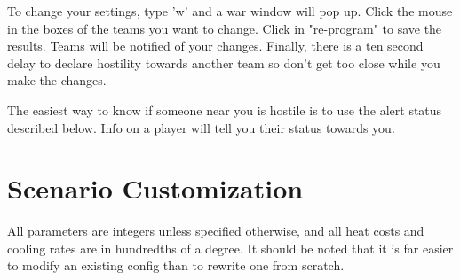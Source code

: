 To change your settings, type 'w' and a war window will pop up.
Click the mouse in the boxes of the teams you want to change.
Click in "re-program" to save the results.  Teams will be notified
of your changes.  Finally, there is a ten second delay to declare
hostility towards another team so don't get too close while you make
the changes.

The easiest way to know if someone near you is hostile is to use
the alert status described below.  Info on a player will tell you
their status towards you.

\section{Scenario Customization}

All parameters are integers unless specified otherwise, and all 
heat costs and cooling rates are in hundredths of a degree. It should
be noted that it is far easier to modify an existing config than to
rewrite one from scratch.

